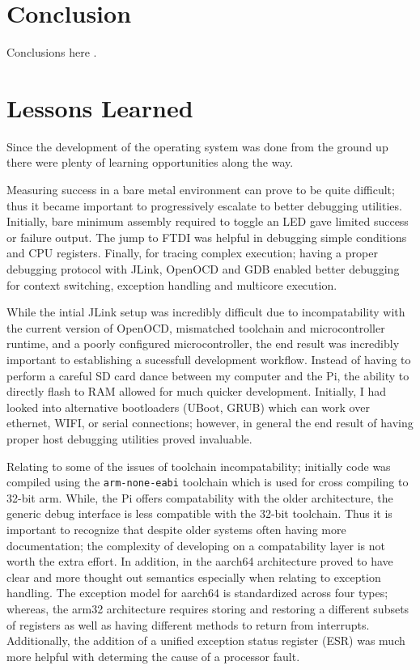 \documentclass[11pt]{article}
\begin{document}
\section{Conclusion}
\label{sec:conclusion}

Conclusions here \cite{freebsd} \cite{unix}.

\section{Lessons Learned}
\label{sec:lessons}
Since the development of the operating system was done from the ground up there were plenty of learning opportunities along the way.  

Measuring success in a bare metal environment can prove to be quite difficult; thus it became important to progressively escalate to better debugging utilities.  Initially, bare minimum assembly required to toggle an LED gave limited success or failure output.  The jump to FTDI was helpful in debugging simple conditions and CPU registers.  Finally, for tracing complex execution; having a proper debugging protocol with JLink, OpenOCD and GDB enabled better debugging for context switching, exception handling and multicore execution.

While the intial JLink setup was incredibly difficult due to incompatability with the current version of OpenOCD, mismatched toolchain and microcontroller runtime, and a poorly configured microcontroller, the end result was incredibly important to establishing a sucessfull development workflow.  Instead of having to perform a careful SD card dance between my computer and the Pi, the ability to directly flash to RAM allowed for much quicker development.  Initially, I had looked into alternative bootloaders (UBoot, GRUB) which can work over ethernet, WIFI, or serial connections; however, in general the end result of having proper host debugging utilities proved invaluable.

Relating to some of the issues of toolchain incompatability; initially code was compiled using the \texttt{arm-none-eabi} toolchain which is used for cross compiling to 32-bit arm.  While, the Pi offers compatability with the older architecture, the generic debug interface is less compatible with the 32-bit toolchain.  Thus it is important to recognize that despite older systems often having more documentation; the complexity of developing on a compatability layer is not worth the extra effort.  In addition, in the aarch64 architecture proved to have clear and more thought out semantics especially when relating to exception handling.  The exception model for aarch64 is standardized across four types; whereas, the arm32 architecture requires storing and restoring a different subsets of registers as well as having different methods to return from interrupts.  Additionally, the addition of a unified exception status register (ESR) was much more helpful with determing the cause of a processor fault.
\end{document}
